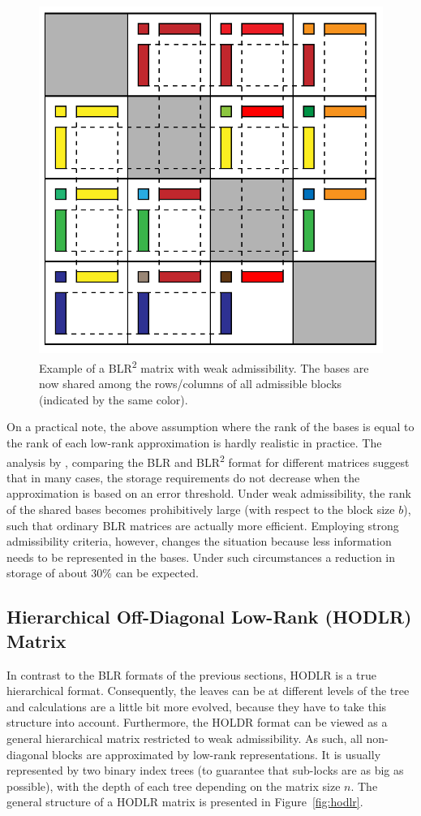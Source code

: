 \begin{figure}[h]
    \centering
    \includegraphics[width=0.6\linewidth]{chapters/4_hierarchical_matrices/figures/BLR_shared.pdf}
    \caption[BLR\texorpdfstring{\textsuperscript{2}}{2} Matrix]{Example of a BLR\textsuperscript{2} matrix with weak admissibility. The bases are now shared among the rows/columns of all admissible blocks (indicated by the same color).}
    \label{fig:blr_shared}
\end{figure}

On a practical note, the above assumption where the rank of the bases is equal to the rank of each low-rank approximation is hardly realistic in practice. The analysis by \cite{ashcraft_block_2020}, comparing the BLR and BLR\textsuperscript{2} format for different matrices suggest that in many cases, the storage requirements do not decrease when the approximation is based on an error threshold. Under weak admissibility, the rank of the shared bases becomes prohibitively large (with respect to the block size $b$), such that ordinary BLR matrices are actually more efficient. Employing strong admissibility criteria, however, changes the situation because less information needs to be represented in the bases. Under such circumstances a reduction in storage of about 30\% can be expected.


\subsection{Hierarchical Off-Diagonal Low-Rank (HODLR) Matrix}
\label{sec:hodlr}

In contrast to the BLR formats of the previous sections, HODLR is a true hierarchical format. Consequently, the leaves can be at different levels of the tree and calculations are a little bit more evolved, because they have to take this structure into account. Furthermore, the HOLDR format can be viewed as a general hierarchical matrix restricted to weak admissibility. As such, all non-diagonal blocks are approximated by low-rank representations. It is usually represented by two binary index trees (to guarantee that sub-locks are as big as possible), with the depth of each tree depending on the matrix size $n$. The general structure of a HODLR matrix is presented in Figure~\hyperref[fig:hodlr]{\ref{fig:hodlr}}.

